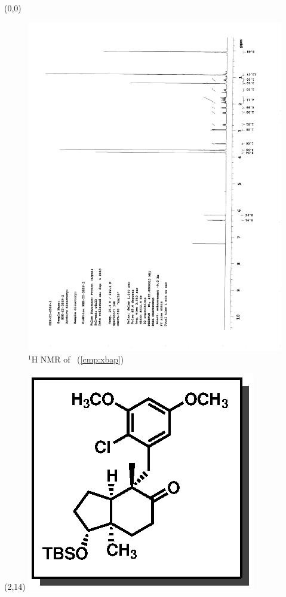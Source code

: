 \begin{textblock}{20}(0,0)
\begin{figure}[htb]
\caption{$^1$H NMR of \CMPxbap\ (\ref{cmp:xbap})}
\includegraphics[scale=0.75, trim = 0mm 0mm 0mm 5mm,
clip]{chp_singlecarbon/images/nmr/xbapH}
\vspace{-100pt}
\end{figure}
\end{textblock}
\begin{textblock}{1}(2,14)
\includegraphics[scale=0.8, angle=90]{chp_singlecarbon/images/xbap}
\end{textblock}
